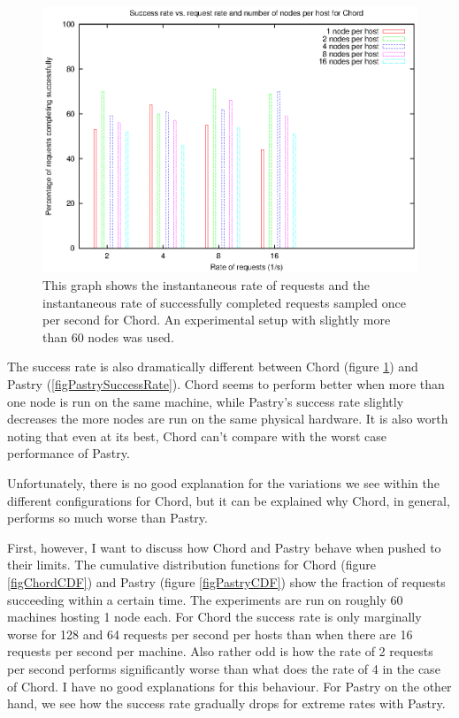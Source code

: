 \begin{figure}[!htbp]
  \begin{center}
    \includegraphics[width=0.9\linewidth]{illustrations/success_rate_chord.eps}
    \caption{This graph shows the instantaneous rate of requests and the instantaneous rate of successfully completed requests sampled once per second for Chord. An experimental setup with slightly more than 60 nodes was used.}
    \label{figChordSuccessRate}
  \end{center}
\end{figure}

The success rate is also dramatically different between Chord (figure \ref{figChordSuccessRate}) and Pastry (\ref{figPastrySuccessRate}). Chord seems to perform better when more than one node is run on the same machine, while Pastry's success rate slightly decreases the more nodes are run on the same physical hardware. It is also worth noting that even at its best, Chord can't compare with the worst case performance of Pastry.

Unfortunately, there is no good explanation for the variations we see within the different configurations for Chord, but it can be explained why Chord, in general, performs so much worse than Pastry.

First, however, I want to discuss how Chord and Pastry behave when pushed to their limits. The cumulative distribution functions for Chord (figure \ref{figChordCDF}) and Pastry (figure \ref{figPastryCDF}) show the fraction of requests succeeding within a certain time. The experiments are run on roughly 60 machines hosting 1 node each. 
For Chord the success rate is only marginally worse for 128 and 64 requests per second per hosts than when there are 16 requests per second per machine. Also rather odd is how the rate of 2 requests per second performs significantly worse than what does the rate of 4 in the case of Chord. I have no good explanations for this behaviour.
For Pastry on the other hand, we see how the success rate gradually drops for extreme rates with Pastry.

